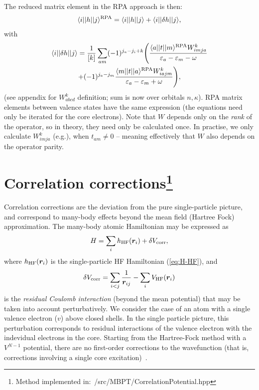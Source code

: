\documentclass[10pt,twocolumn,a4paper]{article}%
\newcommand{\bra}[1]{\ensuremath{\langle #1|}}	%
\newcommand{\ket}[1]{\ensuremath{|#1\rangle}}	%
\renewcommand{\v}[1]{\ensuremath{\boldsymbol{#1}}}		%
\newcommand{\be}{\begin{equation}}
\newcommand{\ee}{\end{equation}}
\def\en{\ensuremath{\varepsilon}}
\renewcommand{\k}{\ensuremath{\kappa}}
\begin{document}
The reduced matrix element in the RPA approach is then:
\be
\bra{i}|h|\ket{j}^{\rm RPA} = \bra{i}|h|\ket{j} + \bra{i}|\delta h|\ket{j},
\ee
with
\begin{multline}
\bra{i}|\delta h|\ket{j} =
\frac{1}{[k]}\sum_{am}(-1)^{j_a-j_i+k}\Bigg(
 \frac{\bra{a}|t|\ket{m}^{\rm RPA}W^k_{imja}}{\en_a-\en_m-\omega}\\
+ (-1)^{j_a-j_m}\frac{\bra{m}|t|\ket{a}^{\rm RPA}W^k_{iajm}}{\en_a-\en_m+\omega}
\Bigg),
\end{multline}
(see appendix for $W^k_{abcd}$ definition; sum is now over {\rm orbitals $n,\k$}).
RPA matrix elements between valence states have the same expression (the equations need only be iterated for the core electrons).
Note that $W$ depends only on the {\em rank} of the operator, so in theory, they need only be calculated once.
In practise, we only calculate $W^k_{imja}$ (e.g.), when $t_{am}\neq0$ -- meaning effectively that $W$ also depends on the operator parity.










\section[Correlation corrections]{Correlation corrections\footnote{Method implemented in:~/src/MBPT/CorrelationPotential.hpp}}

Correlation corrections are the deviation from the pure single-particle picture, and correspond to many-body effects beyond the mean field (Hartree Fock) approximation.
The many-body atomic Hamiltonian may be expressed as
\be
H = \sum_i h_{\rm HF}(\v{r}_i) + \delta V_{\rm corr},
\ee
where $h_{\rm HF}(\v{r}_i)$ is the single-particle HF Hamiltonian (\ref{eq:H-HF}), and
\be\label{eq:residCoul}
\delta V_{\rm corr} = \sum_{i<j}\frac{1}{\v{r}_{ij}} - \sum_iV_{\rm HF}(\v{r}_i)
\ee
is the {\em residual Coulomb interaction} (beyond the mean potential) that may be taken into account perturbatively.
We consider the case of an atom with a single valence electron ($v$) above closed shells.
In the single particle picture, this perturbation corresponds to residual interactions of the valence electron with the indevidual electrons in the core.
Starting from the Hartree-Fock method with a $V^{N-1}$ potential, there are no first-order corrections to the wavefunction (that is, corrections involving a single core excitation)~\cite{Lindgren1986}.
\end{document}
